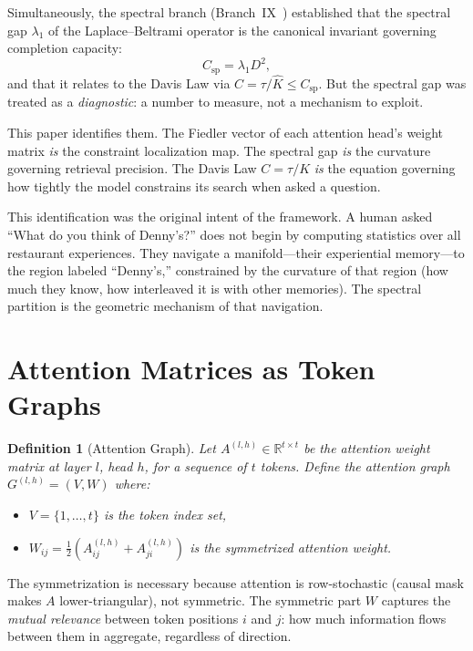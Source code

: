 \documentclass[11pt]{article}
\newtheorem{definition}{Definition}[section]
\theoremstyle{remark}
\newcommand{\R}{\mathbb{R}}
\newcommand{\Csp}{C_{\mathrm{sp}}}
\newcommand{\Khat}{\hat{K}}
\begin{document}
Simultaneously, the spectral branch (Branch~IX~\cite{davis2026spectral}) 
established that the spectral gap $\lambda_1$ of the Laplace--Beltrami 
operator is the canonical invariant governing completion capacity:
\begin{equation}\label{eq:csp}
  \Csp = \lambda_1 D^2,
\end{equation}
and that it relates to the Davis Law via $C = \tau/\Khat \leq \Csp$.
But the spectral gap was treated as a \emph{diagnostic}: a number 
to measure, not a mechanism to exploit.

This paper identifies them. The Fiedler vector of each attention 
head's weight matrix \emph{is} the constraint localization map. 
The spectral gap \emph{is} the curvature governing retrieval 
precision. The Davis Law $C = \tau/K$ \emph{is} the equation 
governing how tightly the model constrains its search when asked 
a question.

This identification was the original intent of the framework. 
A human asked ``What do you think of Denny's?'' does not begin 
by computing statistics over all restaurant experiences. They 
navigate a manifold---their experiential memory---to the region 
labeled ``Denny's,'' constrained by the curvature of that region 
(how much they know, how interleaved it is with other memories). 
The spectral partition is the geometric mechanism of that navigation.


\section{Attention Matrices as Token Graphs}
\label{sec:attention_graph}

\begin{definition}[Attention Graph]\label{def:attn_graph}
Let $A^{(l,h)} \in \R^{t \times t}$ be the attention weight matrix 
at layer $l$, head $h$, for a sequence of $t$ tokens. Define the 
\emph{attention graph} $G^{(l,h)} = (V, W)$ where:
\begin{itemize}[nosep]
  \item $V = \{1, \ldots, t\}$ is the token index set,
  \item $W_{ij} = \tfrac{1}{2}(A^{(l,h)}_{ij} + A^{(l,h)}_{ji})$ 
    is the symmetrized attention weight.
\end{itemize}
\end{definition}

The symmetrization is necessary because attention is row-stochastic 
(causal mask makes $A$ lower-triangular), not symmetric. The 
symmetric part $W$ captures the \emph{mutual relevance} between 
token positions $i$ and $j$: how much information flows between 
them in aggregate, regardless of direction.
\end{document}
